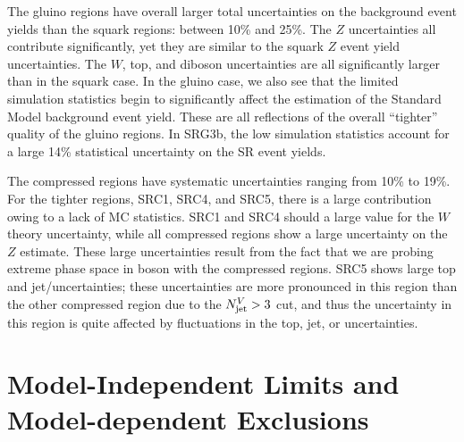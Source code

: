 The gluino regions have overall larger total uncertainties on the background event yields than the squark regions: between 10\% and 25\%.
The $Z$ uncertainties all contribute significantly, yet they are similar to the squark $Z$ event yield uncertainties.
The $W$, top, and diboson uncertainties are all significantly larger than in the squark case.
In the gluino case, we also see that the limited simulation statistics begin to significantly affect the estimation of the Standard Model background event yield.
These are all reflections of the overall ``tighter'' quality of the gluino regions.
In SRG3b, the low simulation statistics account for a large 14\% statistical uncertainty on the SR event yields.

The compressed regions have systematic uncertainties ranging from 10\% to 19\%.
For the tighter regions, SRC1, SRC4, and SRC5, there is a large contribution owing to a lack of MC statistics.
SRC1 and SRC4 should a large value for the $W$ theory uncertainty, while all compressed regions show a large uncertainty on the $Z$ estimate.
These large uncertainties result from the fact that we are probing extreme phase space in boson \pt with the compressed regions.
SRC5 shows large top and jet/\met uncertainties; these uncertainties are more pronounced in this region than the other compressed region due to the $N_{\text{jet}}^V > 3$ cut, and thus the uncertainty in this region is quite affected by fluctuations in the top, jet, or \met uncertainties.




\section{Model-Independent Limits and Model-dependent Exclusions}

